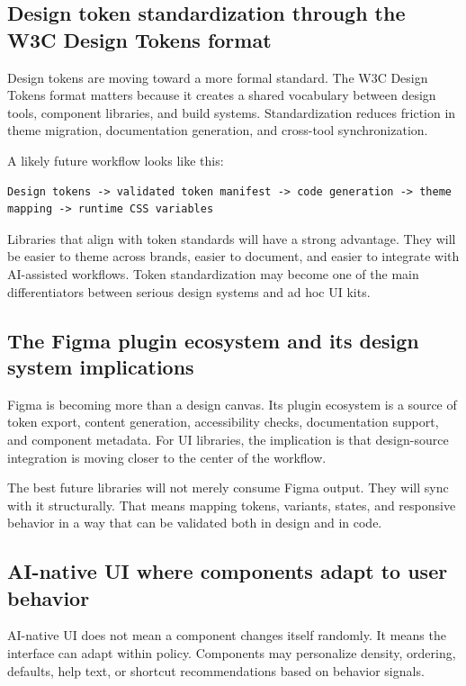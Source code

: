 \subsection{Design token standardization through the W3C Design Tokens format}
Design tokens are moving toward a more formal standard. The W3C Design Tokens format matters because it creates a shared vocabulary between design tools, component libraries, and build systems. Standardization reduces friction in theme migration, documentation generation, and cross-tool synchronization.

A likely future workflow looks like this:

\begin{verbatim}
Design tokens -> validated token manifest -> code generation -> theme mapping -> runtime CSS variables
\end{verbatim}

Libraries that align with token standards will have a strong advantage. They will be easier to theme across brands, easier to document, and easier to integrate with AI-assisted workflows. Token standardization may become one of the main differentiators between serious design systems and ad hoc UI kits.

\subsection{The Figma plugin ecosystem and its design system implications}
Figma is becoming more than a design canvas. Its plugin ecosystem is a source of token export, content generation, accessibility checks, documentation support, and component metadata. For UI libraries, the implication is that design-source integration is moving closer to the center of the workflow.

The best future libraries will not merely consume Figma output. They will sync with it structurally. That means mapping tokens, variants, states, and responsive behavior in a way that can be validated both in design and in code.

\subsection{AI-native UI where components adapt to user behavior}
AI-native UI does not mean a component changes itself randomly. It means the interface can adapt within policy. Components may personalize density, ordering, defaults, help text, or shortcut recommendations based on behavior signals.

